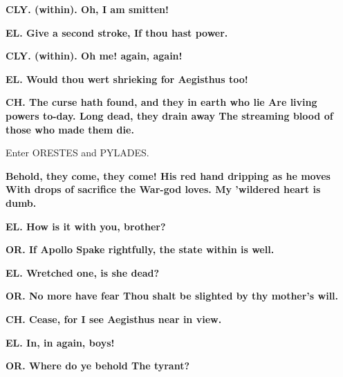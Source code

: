 \documentclass[11pt,letter]{book}
\begin{document}
\par \textbf{CLY. (within). Oh, I am smitten!}
\par 

\par \textbf{EL. Give a second stroke, If thou hast power.}
\par 

\par \textbf{CLY. (within). Oh me! again, again!}
\par 

\par \textbf{EL. Would thou wert shrieking for Aegisthus too!}
\par 

\par \textbf{CH. The curse hath found, and they in earth who lie Are living powers to-day. Long dead, they drain away The streaming blood of those who made them die.}
\par 

\par  Enter ORESTES and PYLADES.

\par \textbf{Behold, they come, they come! His red hand dripping as he moves With drops of sacrifice the War-god loves. My ’wildered heart is dumb.}
\par 

\par \textbf{EL. How is it with you, brother?}
\par 

\par \textbf{OR. If Apollo Spake rightfully, the state within is well.}
\par 

\par \textbf{EL. Wretched one, is she dead?}
\par 

\par \textbf{OR. No more have fear Thou shalt be slighted by thy mother’s will.}
\par 

\par \textbf{CH. Cease, for I see Aegisthus near in view.}
\par 

\par \textbf{EL. In, in again, boys!}
\par 

\par \textbf{OR. Where do ye behold The tyrant?}
\par 
\end{document}
